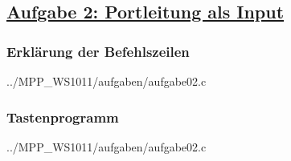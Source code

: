 \subsection*
{\href{http://cst.mi.fu-berlin.de/intern/19606-P-MPP/Aufgaben/040102.html}
{Aufgabe 2: Portleitung als Input}}

\subsubsection*{Erklärung der Befehlszeilen}

{../MPP_WS1011/aufgaben/aufgabe02.c}

\subsubsection*{Tastenprogramm}

{../MPP_WS1011/aufgaben/aufgabe02.c}
